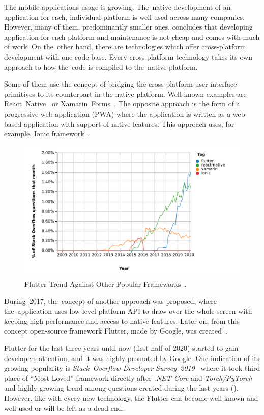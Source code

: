 \begin{introduction}
The mobile applications usage is growing. The~native development of an application for each, individual platform is well used across many companies. However, many of them, predominantly smaller ones, concludes that developing application for each platform and maintenance is not cheap and comes with much of work. On the~other hand, there are technologies which offer cross-platform development with one code-base. Every cross-platform technology takes its own approach to how the~code is compiled to the~native platform. 

Some of them use the concept of bridging the cross-platform user interface primitives to its counterpart in the native platform. Well-known examples are React~Native~\cite{react-native} or Xamarin~Forms~\cite{xamarin-forms}. The opposite approach is the form of a progressive web application (PWA) where the application is written as a web-based application with support of native features. This approach uses, for example, Ionic framework~\cite{ionic}. 

\begin{figure}[htp]
    \centering
    \includegraphics[width=0.88\linewidth]{img/introduction/so-flutter-trend.pdf}
    \caption{Flutter Trend Against Other Popular Frameworks~\cite{so-flutter-trend}.}
    \label{fig:so-flutter-trend}
\end{figure}

During~2017, the~concept of another approach was proposed, where the~application uses low-level platform API to draw over the whole screen with keeping high performance and access to native features. Later on, from this concept open-source framework Flutter, made by Google,  was created~\cite{flutter}. 

Flutter for the last three years until now (first half of 2020) started to gain developers attention, and it was highly promoted by Google. One indication of its growing popularity is \textit{Stack~Overflow Developer Survey~2019}~\cite{so-2019-survey} where it took third place of ``Most Loved'' framework directly after \textit{.NET Core} and \textit{Torch/PyTorch} and highly growing trend among questions created during the last years (). However, like with every new technology, the Flutter can become well-known and well used or will be left as a dead-end. 


\end{introduction}
